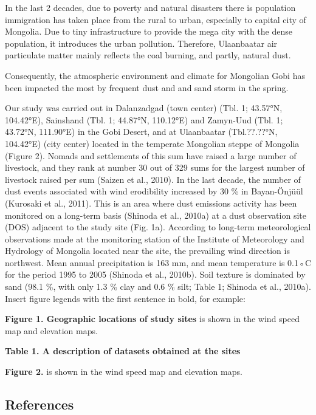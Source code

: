 \documentclass[
  11pt,
]{article}
\begin{document}
In the last 2 decades, due to poverty and natural disasters there is
population immigration has taken place from the rural to urban,
especially to capital city of Mongolia. Due to tiny infrastructure to
provide the mega city with the dense population, it introduces the urban
pollution. Therefore, Ulaanbaatar air particulate matter mainly reflects
the coal burning, and partly, natural dust.

Consequently, the atmospheric environment and climate for Mongolian Gobi
has been impacted the most by frequent dust and and sand storm in the
spring.

Our study was carried out in Dalanzadgad (town center) (Tbl. 1; 43.57°N,
104.42°E), Sainshand (Tbl. 1; 44.87°N, 110.12°E) and Zamyn-Uud (Tbl. 1;
43.72°N, 111.90°E) in the Gobi Desert, and at Ulaanbaatar (Tbl.??.??°N,
104.42°E) (city center) located in the temperate Mongolian steppe of
Mongolia (Figure 2). Nomads and settlements of this sum have raised a
large number of livestock, and they rank at number 30 out of 329 sums
for the largest number of livestock raised per sum (Saizen et al.,
2010). In the last decade, the number of dust events associated with
wind erodibility increased by 30 \% in Bayan-Önjüül (Kurosaki et al.,
2011). This is an area where dust emissions activity has been monitored
on a long-term basis (Shinoda et al., 2010a) at a dust observation site
(DOS) adjacent to the study site (Fig. 1a). According to long-term
meteorological observations made at the monitoring station of the
Institute of Meteorology and Hydrology of Mongolia located near the
site, the prevailing wind direction is northwest. Mean annual
precipitation is 163 mm, and mean temperature is 0.1◦C for the period
1995 to 2005 (Shinoda et al., 2010b). Soil texture is dominated by sand
(98.1 \%, with only 1.3 \% clay and 0.6 \% silt; Table 1; Shinoda et
al., 2010a). Insert figure legends with the first sentence in bold, for
example:

\textbf{Figure 1. Geographic locations of study sites} is shown in the
wind speed map and elevation maps.

\textbf{Table 1. A description of datasets obtained at the sites}

\textbf{Figure 2.} is shown in the wind speed map and elevation maps.

\cite{Schloss2009} \newpage

\subsection{References}\label{references}
\end{document}

